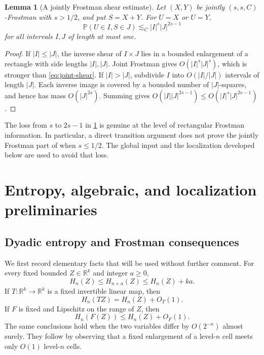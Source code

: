 \documentclass[11pt]{article}
\newtheorem{lemma}[theorem]{Lemma}
\begin{document}
\begin{lemma}[A jointly Frostman shear estimate]
\label{lem:joint-shear}
Let \((X,Y)\) be jointly \((s,s,C)\)-Frostman with \(s>1/2\), and
put \(S=X+Y\).  For \(U=X\) or \(U=Y\),
\begin{equation}
 \mathbb P(U\in I,S\in J)
 \lesssim_C |I|^s|J|^{2s-1}
 \label{eq:joint-shear}
\end{equation}
for all intervals \(I,J\) of length at most one.
\end{lemma}

\begin{proof}
If \(|I|\le|J|\), the inverse shear of \(I\times J\) lies in a
bounded enlargement of a rectangle with side lengths \(|I|,|J|\).
Joint Frostman gives \(O(|I|^s|J|^s)\), which is stronger than
\eqref{eq:joint-shear}.  If \(|I|>|J|\), subdivide \(I\) into
\(O(|I|/|J|)\) intervals of length \(|J|\).  Each inverse image is
covered by a bounded number of \(|J|\)-squares, and hence has mass
\(O(|J|^{2s})\).  Summing gives
\(O(|I||J|^{2s-1})\le O(|I|^s|J|^{2s-1})\).
\end{proof}

The loss from \(s\) to \(2s-1\) in
\cref{lem:joint-shear} is genuine at the level of rectangular
Frostman information.  In particular, a direct transition argument
does not prove the jointly Frostman part of  when
\(s\le1/2\).  The global input  and the
localization developed below are used to avoid that loss.

\section{Entropy, algebraic, and localization preliminaries}
\label{sec:preliminaries}

\subsection{Dyadic entropy and Frostman consequences}

We first record elementary facts that will be used without further
comment.  For every fixed bounded \(Z\in\mathbb R^k\) and integer \(a\ge0\),
\begin{equation}
 H_n(Z)\le H_{n+a}(Z)\le H_n(Z)+ka.
 \label{eq:entropy-refinement}
\end{equation}
If \(T:\mathbb R^k\to\mathbb R^k\) is a fixed invertible linear map, then
\begin{equation}
 H_n(TZ)=H_n(Z)+O_T(1).
 \label{eq:linear-entropy}
\end{equation}
If \(F\) is fixed and Lipschitz on the range of \(Z\), then
\begin{equation}
 H_n(F(Z))\le H_n(Z)+O_F(1).
 \label{eq:Lipschitz-entropy}
\end{equation}
The same conclusions hold when the two variables differ by
\(O(2^{-n})\) almost surely.  They follow by observing that a fixed
enlargement of a level-\(n\) cell meets only \(O(1)\) level-\(n\)
cells.
\end{document}
